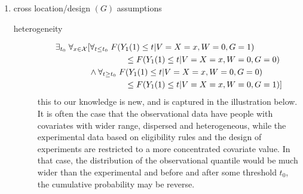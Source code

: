 \documentclass[uplatex,dvipdfmx]{jsarticle}
\begin{document}
\begin{enumerate}[(1)]
    \item cross location/design $(G)$ assumptions
        \begin{description}
            \item[heterogeneity]
            \begin{align*}
                &\exists_{t_0}\;\forall_{x\in\mathcal{X}} [ \forall_{t \leq t_0}\;F(Y_1(1) \leq t |V = X=x ,W= 0, G=1) \\
                &\hphantom{\exists_{t_0}\;\forall_{x\in\mathcal{X}} [ \forall_{t \leq t_0}}\qquad\leq F(Y_1(1) \leq t |V = X=x ,W= 0, G=0)   \\
                &\qquad\qquad\land \forall_{ t \geq t_0}\;F(Y_1(1) \leq t |V = X=x ,W= 0, G=0) \\
                &\hphantom{\exists_{t_0}\;\forall_{x\in\mathcal{X}} [ \forall_{t \leq t_0}}\qquad\leq F(Y_1(1) \leq t |V = X=x ,W= 0, G=1)]
            \end{align*}
            this to our knowledge is new, and is captured in the illustration below. It is often the case that the observational data have people with covariates with wider range, dispersed and heterogeneous, while the experimental data based on eligibility rules and the design of experiments are restricted to a more concentrated covariate value. In that case, the distribution of the observational quantile would be much wider than the experimental and before and after some threshold $t_0$, the cumulative probability may be reverse. 
        \end{description}
\end{enumerate}
\end{document}
